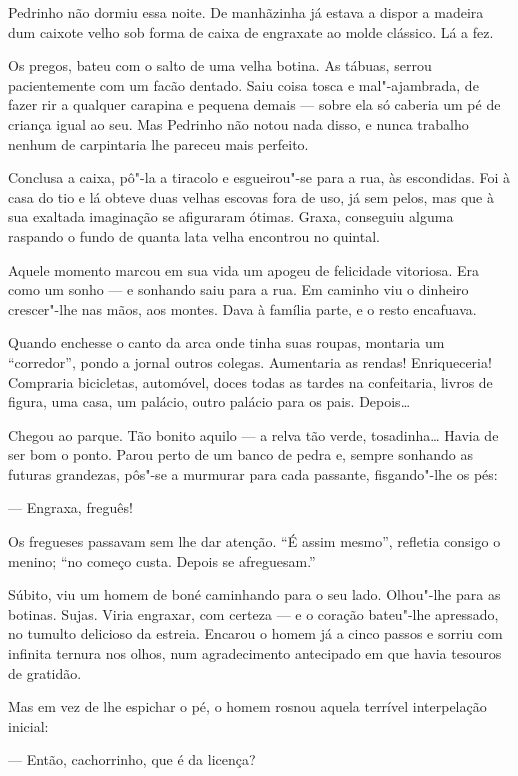 Pedrinho não dormiu essa noite. De manhãzinha já estava a dispor a
madeira dum caixote velho sob forma de caixa de engraxate ao molde
clássico. Lá a fez.

Os pregos, bateu com o salto de uma velha botina. As tábuas, serrou
pacientemente com um facão dentado. Saiu coisa tosca e mal"-ajambrada, de
fazer rir a qualquer carapina e pequena demais --- sobre ela só caberia
um pé de criança igual ao seu. Mas Pedrinho não notou nada disso, e
nunca trabalho nenhum de carpintaria lhe pareceu mais perfeito.

Conclusa a caixa, pô"-la a tiracolo e esgueirou"-se para a rua, às
escondidas. Foi à casa do tio e lá obteve duas velhas escovas fora de
uso, já sem pelos, mas que à sua exaltada imaginação se afiguraram
ótimas. Graxa, conseguiu alguma raspando o fundo de quanta lata velha
encontrou no quintal.

Aquele momento marcou em sua vida um apogeu de felicidade vitoriosa. Era
como um sonho --- e sonhando saiu para a rua. Em caminho viu o dinheiro
crescer"-lhe nas mãos, aos montes. Dava à família parte, e o resto
encafuava.

Quando enchesse o canto da arca onde tinha suas roupas, montaria um
``corredor'', pondo a jornal outros colegas. Aumentaria as rendas!
Enriqueceria! Compraria bicicletas, automóvel, doces todas as tardes na
confeitaria, livros de figura, uma casa, um palácio, outro palácio para
os pais. Depois\ldots{}

Chegou ao parque. Tão bonito aquilo --- a relva tão verde, tosadinha\ldots{}
Havia de ser bom o ponto. Parou perto de um banco de pedra e, sempre
sonhando as futuras grandezas, pôs"-se a murmurar para cada passante,
fisgando"-lhe os pés:

--- Engraxa, freguês!

Os fregueses passavam sem lhe dar atenção. ``É assim mesmo'', refletia
consigo o menino; ``no começo custa. Depois se afreguesam.''

Súbito, viu um homem de boné caminhando para o seu lado. Olhou"-lhe para
as botinas. Sujas. Viria engraxar, com certeza --- e o coração bateu"-lhe
apressado, no tumulto delicioso da estreia. Encarou o homem já a cinco
passos e sorriu com infinita ternura nos olhos, num agradecimento
antecipado em que havia tesouros de gratidão.

Mas em vez de lhe espichar o pé, o homem rosnou aquela terrível
interpelação inicial:

--- Então, cachorrinho, que é da licença?

